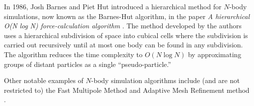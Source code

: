 In 1986, Josh Barnes and Piet Hut introduced a hierarchical method for $N$-body simulations, now known as the Barnes-Hut algorithm, in the paper \textit{A hierarchical O(N log N) force-calculation algorithm} \cite{barnes1986hierarchical}.
The method developed by the authors uses a hierarchical subdivision of space into cubical cells where the subdivision is carried out recursively until at most one body can be found in any subdivision.
The algorithm reduces the time complexity to $O(N \log N)$ by approximating groups of distant particles as a single ``pseudo-particle.''

Other notable examples of $N$-body simulation algorithms include (and are not restricted to) the Fast Multipole Method and Adaptive Mesh Refinement method \cite{trenti2008nbody}.

